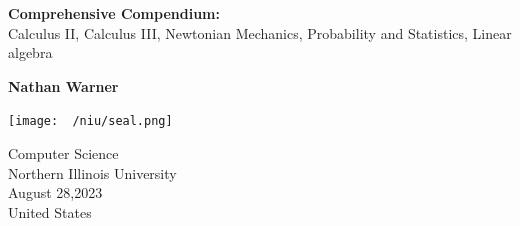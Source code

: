\documentclass{report}
\title{\Huge{}}
\author{\huge{Nathan Warner}}
\date{\huge{}}
\begin{document}
        \begin{titlepage}
       \begin{center}
           \vspace*{1cm}
    
           \textbf{Comprehensive Compendium:} \\
            Calculus II, Calculus III, Newtonian Mechanics, Probability and Statistics, Linear algebra
    
           \vspace{0.5cm}
            
                
           \vspace{1.5cm}
    
           \textbf{Nathan Warner}
    
           \vfill
                
                
           \vspace{0.8cm}
         
           \texttt{[image: ~/niu/seal.png]}
                
           Computer Science \\
           Northern Illinois University\\
           August 28,2023 \\
           United States\\
           
                
       \end{center}
    \end{titlepage}
    \tableofcontents
    \pagebreak \bigbreak \noindent
    \bigbreak \noindent 

    \bigbreak \noindent 
\end{document}

